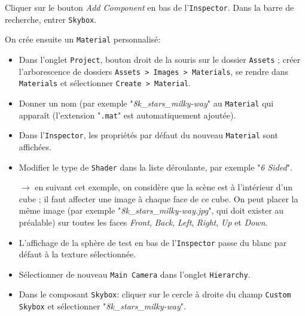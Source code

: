 \documentclass[a4paper,10pt]{article}
\newenvironment{solution}%
{\begin{tcolorbox}[breakable,colback=red!5!white,colframe=red!75!black,title=Solution]}%
{\end{tcolorbox}}
\begin{document}
\begin{solution}
Cliquer sur le bouton \textit{Add Component} en bas de l'\texttt{Inspector}. Dans la barre de recherche, entrer \texttt{Skybox}.

On crée ensuite un \texttt{Material} personnalisé:
\begin{itemize}
	\item Dans l'onglet \texttt{Project}, bouton droit de la souris sur le dossier \texttt{Assets} ; créer l'arborescence de dossiers \texttt{Assets > Images > Materials}, se rendre dans \texttt{Materials}  et sélectionner \texttt{Create > Material}.
	\item Donner un nom (par exemple "\textit{8k\_stars\_milky-way}" au \texttt{Material} qui apparaît (l'extension "\texttt{.mat}" est automatiquement ajoutée).
	\item Dans l'\texttt{Inspector}, les propriétés par défaut du nouveau \texttt{Material} sont affichées.
	\item Modifier le type de \texttt{Shader} dans la liste déroulante, par exemple "\textit{6 Sided}".
	\item[$\rightarrow$] en suivant cet exemple, on considère que la scène est à l'intérieur d'un cube ; il faut affecter une image à chaque face de ce cube. On peut placer la même image  (par exemple "\textit{8k\_stars\_milky-way.jpg}", qui doit exister au préalable) sur toutes les faces \textit{Front}, \textit{Back}, \textit{Left}, \textit{Right}, \textit{Up} et \textit{Down}.
	
	\item L'affichage de la sphère de test en bas de l'\texttt{Inspector} passe du blanc par défaut à la texture sélectionnée.
	\item Sélectionner de nouveau \texttt{Main Camera} dans l'onglet \texttt{Hierarchy}.
	\item Dans le composant \texttt{Skybox}: cliquer sur le cercle à droite du champ \texttt{Custom Skybox} et sélectionner "\textit{8k\_stars\_milky-way}".  
	
\end{itemize}
\end{solution}
\fi 
\end{document}
